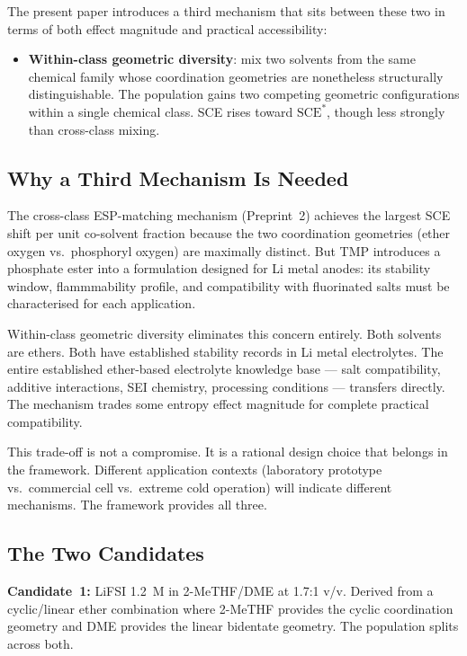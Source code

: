 \documentclass[11pt]{article}
\theoremstyle{plain}
\theoremstyle{definition}
\theoremstyle{remark}
\begin{document}
The present paper introduces a third mechanism that sits between these
two in terms of both effect magnitude and practical accessibility:

\begin{itemize}[leftmargin=2em]
  \item \textbf{Within-class geometric diversity}: mix two solvents
        from the same chemical family whose coordination geometries are
        nonetheless structurally distinguishable.  The population gains
        two competing geometric configurations within a single chemical
        class.  SCE rises toward $\mathrm{SCE}^{*}$, though less
        strongly than cross-class mixing.
\end{itemize}

\subsection{Why a Third Mechanism Is Needed}

The cross-class ESP-matching mechanism (Preprint~2) achieves the
largest SCE shift per unit co-solvent fraction because the two
coordination geometries (ether oxygen vs.\ phosphoryl oxygen) are
maximally distinct.  But TMP introduces a phosphate ester into a
formulation designed for Li metal anodes: its stability window,
flammmability profile, and compatibility with fluorinated salts
must be characterised for each application.

Within-class geometric diversity eliminates this concern entirely.
Both solvents are ethers.  Both have established stability records
in Li metal electrolytes.  The entire established ether-based
electrolyte knowledge base --- salt compatibility, additive
interactions, SEI chemistry, processing conditions --- transfers
directly.  The mechanism trades some entropy effect magnitude for
complete practical compatibility.

This trade-off is not a compromise.  It is a rational design choice
that belongs in the framework.  Different application contexts
(laboratory prototype vs.\ commercial cell vs.\ extreme cold
operation) will indicate different mechanisms.  The framework
provides all three.

\subsection{The Two Candidates}

\textbf{Candidate~1:} LiFSI 1.2~M in 2-MeTHF/DME at 1.7:1 v/v.
Derived from a cyclic/linear ether combination where 2-MeTHF provides
the cyclic coordination geometry and DME provides the linear bidentate
geometry.  The population splits across both.
\end{document}
